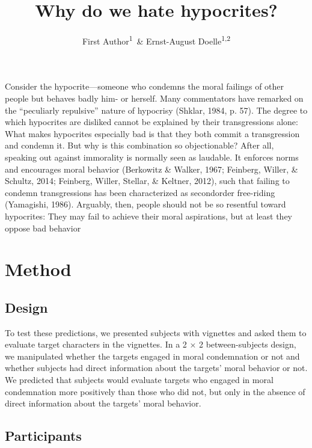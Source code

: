 \documentclass[english,pub]{apa6}
\title{Why do we hate hypocrites?}
\author{First Author\textsuperscript{1}~\& Ernst-August Doelle\textsuperscript{1,2}}
\affiliation{
    \vspace{0.5cm}
          \textsuperscript{1} Wilhelm-Wundt-University\\
          \textsuperscript{2} Konstanz Business School  }
\theoremstyle{definition}
\theoremstyle{definition}
\theoremstyle{remark}
\begin{document}
\maketitle

\setcounter{secnumdepth}{0}



Consider the hypocrite---someone who condemns the moral failings of
other people but behaves badly him- or herself. Many commentators have
remarked on the \enquote{peculiarly repulsive} nature of hypocrisy
(Shklar, 1984, p. 57). The degree to which hypocrites are disliked
cannot be explained by their transgressions alone: What makes hypocrites
especially bad is that they both commit a transgression and condemn it.
But why is this combination so objectionable? After all, speaking out
against immorality is normally seen as laudable. It enforces norms and
encourages moral behavior (Berkowitz \& Walker, 1967; Feinberg, Willer,
\& Schultz, 2014; Feinberg, Willer, Stellar, \& Keltner, 2012), such
that failing to condemn transgressions has been characterized as
secondorder free-riding (Yamagishi, 1986). Arguably, then, people should
not be so resentful toward hypocrites: They may fail to achieve their
moral aspirations, but at least they oppose bad behavior

\section{Method}\label{method}

\subsection{Design}\label{design}

To test these predictions, we presented subjects with vignettes and
asked them to evaluate target characters in the vignettes. In a 2 × 2
between-subjects design, we manipulated whether the targets engaged in
moral condemnation or not and whether subjects had direct information
about the targets' moral behavior or not. We predicted that subjects
would evaluate targets who engaged in moral condemnation more positively
than those who did not, but only in the absence of direct information
about the targets' moral behavior.

\subsection{Participants}\label{participants}
\end{document}
